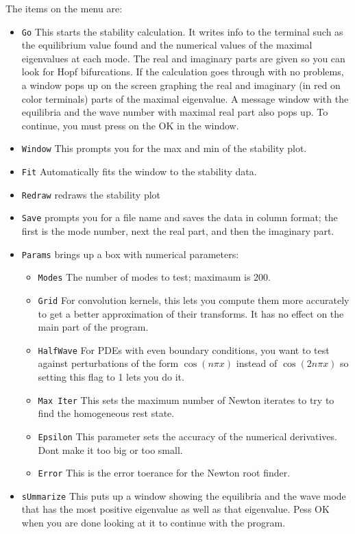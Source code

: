 The items on the menu are:
\begin{itemize}
\item{\tt Go} This starts the stability calculation.  It writes info
to the terminal such as the equilibrium value found and the numerical
values of the maximal eigenvalues at each mode.  The real and
imaginary parts are given so you can look for Hopf bifurcations. If
the calculation goes through with no problems, a window pops up on the
screen graphing the real and imaginary (in red on color terminals)
parts of the maximal eigenvalue. A message window with the equilibria
and the wave number with maximal real part also pops up.  To continue,
you must press on the OK in the window.
\item{\tt Window} This prompts you for the max and min of the
stability plot.
\item{\tt Fit} Automatically fits the window to the stability data.
\item{\tt Redraw} redraws the stability plot
\item{\tt Save} prompts you for a file name and saves the data in
column format; the first is the mode number, next the real part, and
then the imaginary part.
\item{\tt Params} brings up a box with numerical parameters:
\begin{itemize}
	\item{\tt Modes} The number of modes to test; maximaum is 200.
	\item{\tt Grid} For convolution kernels, this lets you compute
them more accurately to get a better approximation of their
transforms.  It has no effect on the main part of the program.
	\item{\tt HalfWave} For PDEs with even boundary conditions,
you want to test against perturbations of the form $\cos(n\pi x)$
instead of $\cos(2n\pi x)$ so setting this flag to 1 lets you do it.
	\item{\tt Max Iter} This sets the maximum number of Newton
iterates to try to find the homogeneous rest state.
	\item{\tt Epsilon} This parameter sets the accuracy of the
numerical derivatives.  Dont make it too big or too small.
	\item{\tt Error} This is the error toerance for the Newton
root finder.
\end{itemize}
\item {\tt sUmmarize} This puts up a window showing the equilibria and
the wave mode that has the most positive eigenvalue as well as that
eigenvalue. Pess OK when you are done looking at it to continue with
the program. 
\end{itemize}


